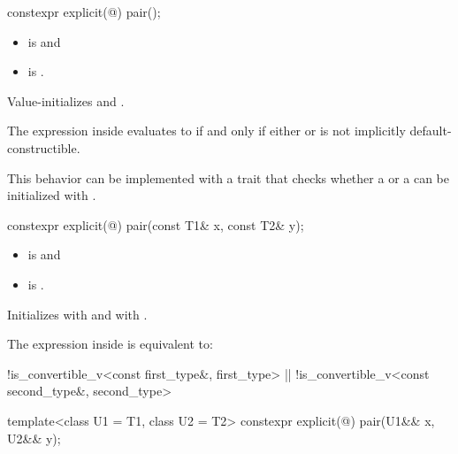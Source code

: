 %
\begin{itemdecl}
constexpr explicit(@\seebelow@) pair();
\end{itemdecl}

\begin{itemdescr}
\pnum
\constraints
\begin{itemize}
\item {} is  and
\item {} is .
\end{itemize}

\pnum
\effects
Value-initializes  and .

\pnum
\remarks
The expression inside  evaluates to 
if and only if either  or
 is not implicitly default-constructible.
\begin{note}
This behavior can be implemented with a trait that checks
whether a  or a 
can be initialized with \tcode{\{\}}.
\end{note}
\end{itemdescr}

%
\begin{itemdecl}
constexpr explicit(@\seebelow@) pair(const T1& x, const T2& y);
\end{itemdecl}

\begin{itemdescr}
\pnum
\constraints
\begin{itemize}
\item {} is  and
\item {} is .
\end{itemize}

\pnum
\effects
Initializes  with  and  with .

\pnum
\remarks
The expression inside  is equivalent to:
\begin{codeblock}
!is_convertible_v<const first_type&, first_type> ||
  !is_convertible_v<const second_type&, second_type>
\end{codeblock}
\end{itemdescr}

%
\begin{itemdecl}
template<class U1 = T1, class U2 = T2> constexpr explicit(@\seebelow@) pair(U1&& x, U2&& y);
\end{itemdecl}

